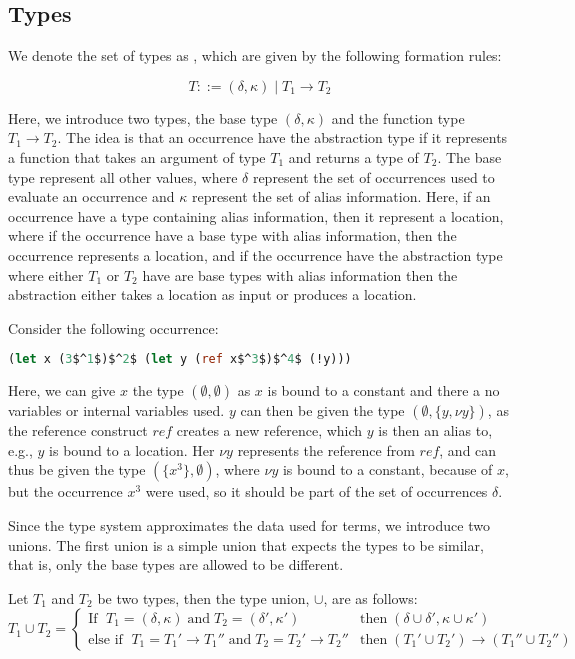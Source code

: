 \documentclass[../../master.tex]{subfiles}
\begin{document}
\subsection{Types}\label{sec:types}
We denote the set of types as , which are given by the following formation rules:

$$T::=(\delta,\kappa)\mid T_1 \rightarrow T_2$$

Here, we introduce two types, the base type $(\delta,\kappa)$ and the function type $T_1 \rightarrow T_2$.
The idea is that an occurrence have the abstraction type if it represents a function that takes an argument of type $T_1$ and returns a type of $T_2$.
The base type represent all other values, where $\delta$ represent the set of occurrences used to evaluate an occurrence and $\kappa$ represent the set of alias information.
Here, if an occurrence have a type containing alias information, then it represent a location, where if the occurrence have a base type with alias information, then the occurrence represents a location, 
and if the occurrence have the abstraction type where either $T_1$ or $T_2$ have are base types with alias information then the abstraction either takes a location as input or produces a location.

\begin{example}[]
Consider the following occurrence:
\begin{lstlisting}[language=Caml, mathescape=true]
(let x (3$^1$)$^2$ (let y (ref x$^3$)$^4$ (!y)))
\end{lstlisting}
Here, we can give $x$ the type $(\emptyset,\emptyset)$ as $x$ is bound to a constant and there a no variables or internal variables used.
$y$ can then be given the type $(\emptyset,\{y,\nu y\})$, as the reference construct $ref$ creates a new reference, which $y$ is then an alias to, e.g., $y$ is bound to a location.
Her $\nu y$ represents the reference from $ref$, and can thus be given the type $(\{x^3\},\emptyset)$, where $\nu y$ is bound to a constant, because of $x$, but the occurrence $x^3$ were used, so it should be part of the set of occurrences $\delta$.
\end{example}

Since the type system approximates the data used for terms, we introduce two unions.
The first union is a simple union that expects the types to be similar, that is, only the base types are allowed to be different.
\begin{definition}
	Let $T_1$ and $T_2$ be two types, then the type union, $\cup$, are as follows:
	\begin{equation*}
		T_1\cup T_2=
		\left\{\begin{matrix}
			\mbox{If } \; T_1=(\delta,\kappa) \;\mbox{and}\; T_2=(\delta',\kappa')  & \mbox{then} \; (\delta\cup\delta',\kappa\cup\kappa')\\
			\mbox{else if } \; T_1=T_1'\rightarrow T_1''\;\mbox{and}\;T_2=T_2'\rightarrow T_2'' & \mbox{then} \; (T_1'\cup T_2')\rightarrow (T_1''\cup T_2'')
		\end{matrix}\right.
	\end{equation*}
\end{definition}
\end{document}
